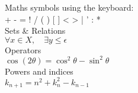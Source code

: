 \documentclass[10pt,a4paper]{article}
\begin{document}
Maths symbols using the keyboard:\\
+ - = ! / ( ) [ ] < > | ' : *\\

Sets \& Relations\\
\begin{math}
\forall x \in X, \quad \exists y \leq \epsilon
\end{math}\\

Operators\\
\begin{math}
\cos (2\theta) = \cos^2 \theta - \sin^2 \theta
\end{math}\\

Powers and indices\\
\begin{math}
k_{n+1} = n^2 + k_n^2 - k_{n-1}
\end{math}
\end{document}

